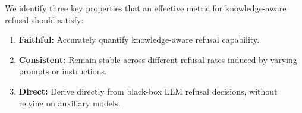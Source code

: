 \begin{remark}
We identify three key properties that an effective metric for knowledge-aware refusal should satisfy:
\begin{enumerate}[leftmargin=*]
    \item \textbf{Faithful:} Accurately quantify knowledge-aware refusal capability.
    \item \textbf{Consistent:} Remain stable across different refusal rates induced by varying prompts or instructions.
    \item \textbf{Direct:} Derive directly from black-box LLM refusal decisions, without relying on auxiliary models.
\end{enumerate} 
\end{remark}
